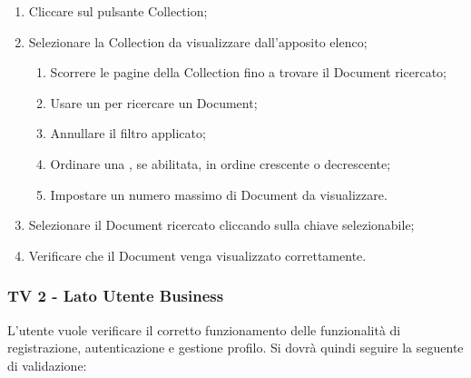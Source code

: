\begin{enumerate}
\item Cliccare sul pulsante Collection;
\item Selezionare la Collection da visualizzare dall'apposito elenco;
\begin{enumerate}
\item Scorrere le pagine della Collection fino a trovare il Document ricercato;
\item Usare un  per ricercare un Document;
\item Annullare il filtro applicato;
\item Ordinare una , se abilitata, in ordine crescente o decrescente;
\item Impostare un numero massimo di Document da visualizzare.
\end{enumerate}
\item Selezionare il Document ricercato cliccando sulla chiave selezionabile;
\item Verificare che il Document venga visualizzato correttamente.
\end{enumerate}

\subsubsection{TV 2 - Lato Utente Business}
L’utente vuole verificare il corretto funzionamento delle funzionalità di registrazione, autenticazione e gestione profilo.
Si dovrà quindi seguire la seguente  di validazione:

